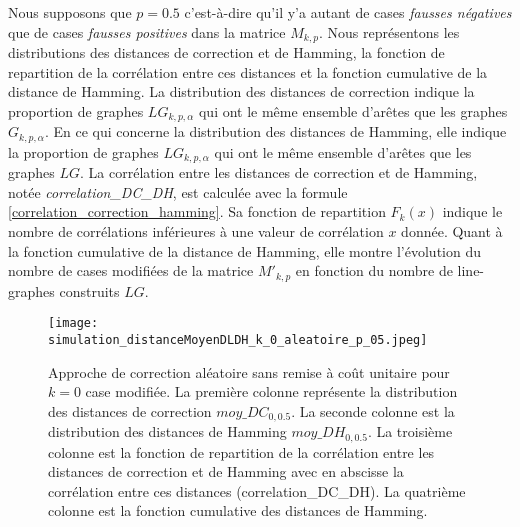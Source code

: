 

Nous supposons que $p=0.5$ c'est-\`a-dire qu'il y'a autant de cases {\em fausses n\'egatives} que de cases {\em fausses positives} dans la matrice $M_{k,p}$.
\newline
Nous repr\'esentons les distributions des distances de correction et de Hamming, la fonction de repartition de la corr\'elation entre ces distances  et la fonction cumulative de la distance de Hamming. 
La distribution des distances de correction indique la proportion de graphes $LG_{k,p,\alpha}$ qui ont le m\^eme ensemble d'ar\^etes que les graphes $G_{k,p,\alpha}$. En ce qui concerne la distribution des distances de Hamming, elle indique  la proportion de graphes $LG_{k,p,\alpha}$ qui ont le m\^eme ensemble d'ar\^etes que les graphes $LG$.
La corr\'elation entre les distances de correction et de Hamming, not\'ee {\em correlation\_DC\_DH}, est calcul\'ee avec la formule \ref{correlation_correction_hamming}. Sa fonction de repartition $F_k(x)$ indique le nombre de corr\'elations inf\'erieures \`a une valeur de corr\'elation $x$ donn\'ee.
Quant \`a la fonction cumulative de la distance de Hamming, elle montre l'\'evolution du nombre de cases modifi\'ees de la matrice $M'_{k,p}$ en fonction du nombre de line-graphes  construits $LG$.
\newline
\begin{figure}[htb!] 
\centering
\texttt{[image: simulation\_distanceMoyenDLDH\_k\_0\_aleatoire\_p\_05.jpeg]}
\caption{ Approche de correction al\'eatoire sans remise \`a co\^ut unitaire pour $k =0 $ case modifi\'ee. La premi\`ere colonne repr\'esente la distribution des distances de correction $moy\_DC_{0,0.5}$. La seconde colonne est la distribution des distances de Hamming $moy\_DH_{0,0.5}$. La troisi\`eme colonne  est la fonction de repartition de la corr\'elation entre les distances de correction et de Hamming avec en abscisse la corr\'elation entre ces distances (correlation\_DC\_DH).  La quatri\`eme colonne est la fonction cumulative des distances de Hamming.}
\label{sansremise_unitaire_distanceMoyenDCDH_k_0_aleatoire_p_05} 
\end{figure}
\FloatBarrier

